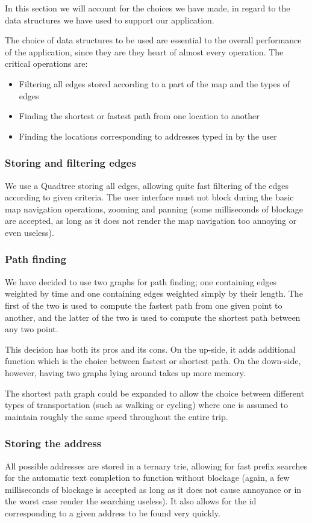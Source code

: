In this section we will account for the choices we have made, in regard to the data structures we have used to support our application.

The choice of data structures to be used are essential to the overall performance of the application, since they are they heart of almost every operation. The critical operations are:
\begin{itemize}
	\item Filtering all edges stored according to a part of the map and the types of edges
	\item Finding the shortest or fastest path from one location to another
	\item Finding the locations corresponding to addresses typed in by the user
\end{itemize}

\subsubsection{Storing and filtering edges}
We use a Quadtree storing all edges, allowing quite fast filtering of the edges according to given criteria. The user interface must not block during the basic map navigation operations, zooming and panning (some milliseconds of blockage are accepted, as long as it does not render the map navigation too annoying or even useless).

\subsubsection{Path finding}
We have decided to use two graphs for path finding; one containing edges weighted by time and one containing edges weighted simply by their length. The first of the two is used to compute the fastest path from one given point to another, and the latter of the two is used to compute the shortest path between any two point.

This decision has both its pros and its cons. On the up-side, it adds additional function which is the choice between fastest or shortest path. On the down-side, however, having two graphs lying around takes up more memory.

The shortest path graph could be expanded to allow the choice between different types of transportation (such as walking or cycling) where one is assumed to maintain roughly the same speed throughout the entire trip.

\subsubsection{Storing the address}
All possible addresses are stored in a ternary trie, allowing for fast prefix searches for the automatic text completion to function without blockage (again, a few milliseconds of blockage is accepted as long as it does not cause annoyance or in the worst case render the searching useless). It also allows for the id corresponding to a given address to be found very quickly.

